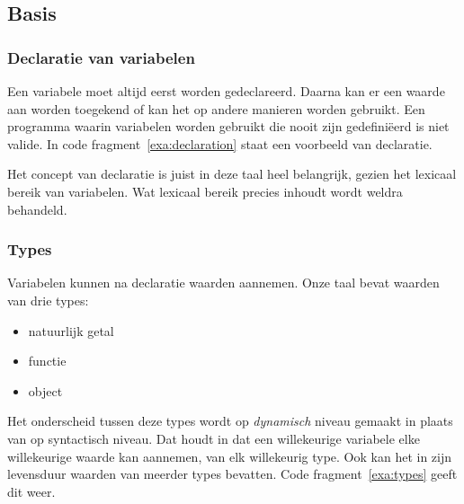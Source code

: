 \subsection{Basis}

\subsubsection{Declaratie van variabelen}

Een variabele moet altijd eerst worden gedeclareerd. Daarna kan er een waarde aan worden toegekend of kan het op andere manieren worden gebruikt. Een programma waarin variabelen worden gebruikt die nooit zijn gedefiniëerd is niet valide. In code fragment~\ref{exa:declaration} staat een voorbeeld van declaratie.

\begin{NoBreak}
\codeFragmentCaption
{}
\end{NoBreak}

Het concept van declaratie is juist in deze taal heel belangrijk, gezien het lexicaal bereik van variabelen. Wat lexicaal bereik precies inhoudt wordt weldra behandeld.

\subsubsection{Types}
\label{subsec:taal-types}

Variabelen kunnen na declaratie waarden aannemen. Onze taal bevat waarden van drie types:
\begin{itemize}
  \item natuurlijk getal
  \item functie
  \item object
\end{itemize}%
Het onderscheid tussen deze types wordt op \emph{dynamisch} niveau gemaakt in plaats van op syntactisch niveau. Dat houdt in dat een willekeurige variabele elke willekeurige waarde kan aannemen, van elk willekeurig type. Ook kan het in zijn levensduur waarden van meerder types bevatten. Code fragment~\ref{exa:types} geeft dit weer.

\begin{NoBreak}
\codeFragmentCaption
{}
\end{NoBreak}

